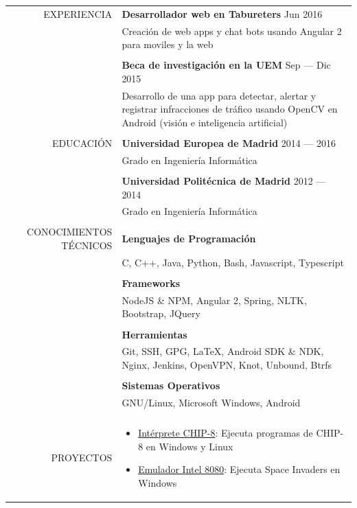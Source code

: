 \documentclass[a4paper, 11pt]{article}
\begin{document}
    \begin{longtable}{rp{11cm}}
        EXPERIENCIA
        & {\bf Desarrollador web en Tabureters} \hfill Jun 2016\\
        & Creación de web apps y chat bots usando Angular 2 para moviles y la web\\\\
        & {\bf Beca de investigación en la UEM} \hfill Sep --- Dic 2015\\
        & Desarrollo de una app para detectar, alertar y registrar infracciones de tráfico usando OpenCV en Android (visión e inteligencia artificial)\\
        \\
        EDUCACIÓN
        & {\bf Universidad Europea de Madrid} \hfill 2014 --- 2016\\
        & Grado en Ingeniería Informática\\\\
        & {\bf Universidad Politécnica de Madrid} \hfill 2012 --- 2014\\
        & Grado en Ingeniería Informática\\\\
        CONOCIMIENTOS TÉCNICOS
        & {\bf Lenguajes de Programación}\\
        & C, C++, Java, Python, Bash, Javascript, Typescript\\\\
        & {\bf Frameworks}\\
        & NodeJS \& NPM, Angular 2, Spring, NLTK, Bootstrap, JQuery\\\\
        & {\bf Herramientas}\\
        & Git, SSH, GPG, \LaTeX, Android SDK \& NDK, Nginx, Jenkins, OpenVPN, Knot, Unbound, Btrfs\\\\
        & {\bf Sistemas Operativos}\\
        & GNU/Linux, Microsoft Windows, Android\\
        \\
        PROYECTOS
        & \vspace{-8mm}
        \begin{itemize}[leftmargin=0cm,label={}]
            \item \href{https://github.com/hugo19941994/CHIP8-Emu}{Intérprete CHIP-8}: Ejecuta programas de CHIP-8 en Windows y Linux
            \item \href{https://github.com/hugo19941994/SpaceInvaders-Emu}{Emulador Intel 8080}: Ejecuta Space Invaders en Windows

\end{itemize}
\end{longtable}
\end{document}
